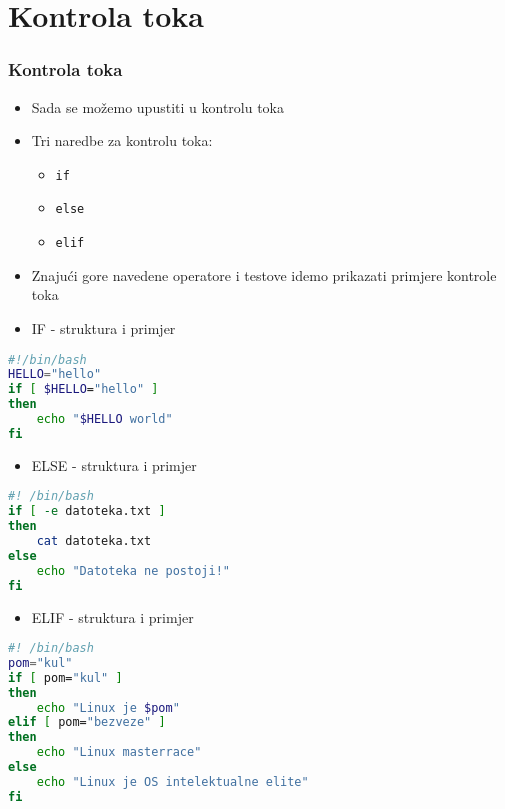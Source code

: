 \documentclass{beamer}
\newcommand{\shell}[1]{\texttt{#1}}
\begin{document}
\section{Kontrola toka}
\begin{frame}
\frametitle{Kontrola toka}
\begin{itemize}
	\item Sada se možemo upustiti u kontrolu toka
	\item Tri naredbe za kontrolu toka:
	\begin{itemize}
		\item \shell{if}
		\item \shell{else}
		\item \shell{elif}
	\end{itemize}
	\item Znajući gore navedene operatore i testove idemo prikazati primjere kontrole toka
\end{itemize}
\end{frame}
\begin{itemize}
	\item IF - struktura i primjer
\end{itemize}
	\begin{lstlisting}[language=bash]
#!/bin/bash
HELLO="hello"
if [ $HELLO="hello" ]
then
	echo "$HELLO world"
fi
	\end{lstlisting}
\begin{itemize}
	\item ELSE - struktura i primjer
\end{itemize}
	
	\begin{lstlisting}[language=bash]
#! /bin/bash
if [ -e datoteka.txt ]
then
	cat datoteka.txt
else
	echo "Datoteka ne postoji!"
fi
	\end{lstlisting}
\begin{itemize}
	\item ELIF - struktura i primjer
\end{itemize}
	
	\begin{lstlisting}[language=bash]
#! /bin/bash
pom="kul"
if [ pom="kul" ]
then
	echo "Linux je $pom"
elif [ pom="bezveze" ]
then 
	echo "Linux masterrace"
else
	echo "Linux je OS intelektualne elite"
fi
	\end{lstlisting}
\end{document}
